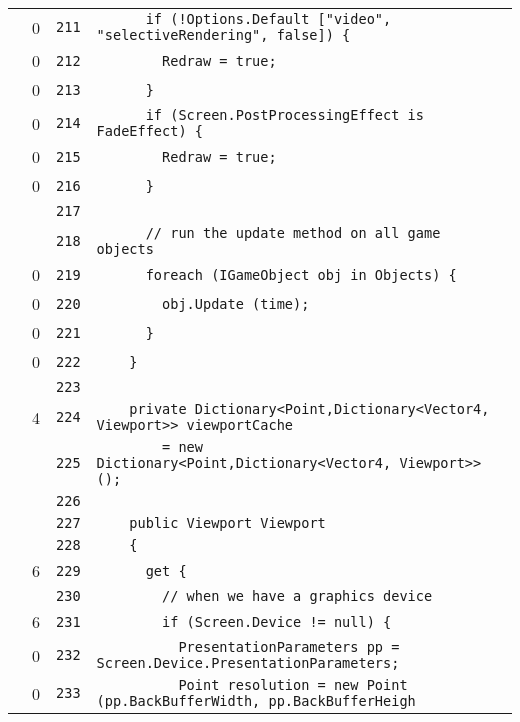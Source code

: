 \documentclass[a4paper,10pt]{article}
\begin{document}
\begin{longtable}[l]{lrrl}
\cellcolor{red} & 0 & \verb~211~ & \verb~      if (!Options.Default ["video", "selectiveRendering", false]) {~\\
\cellcolor{red} & 0 & \verb~212~ & \verb~        Redraw = true;~\\
\cellcolor{red} & 0 & \verb~213~ & \verb~      }~\\
\cellcolor{red} & 0 & \verb~214~ & \verb~      if (Screen.PostProcessingEffect is FadeEffect) {~\\
\cellcolor{red} & 0 & \verb~215~ & \verb~        Redraw = true;~\\
\cellcolor{red} & 0 & \verb~216~ & \verb~      }~\\
\cellcolor{gray} &  & \verb~217~ & \verb~~\\
\cellcolor{gray} &  & \verb~218~ & \verb~      // run the update method on all game objects~\\
\cellcolor{red} & 0 & \verb~219~ & \verb~      foreach (IGameObject obj in Objects) {~\\
\cellcolor{red} & 0 & \verb~220~ & \verb~        obj.Update (time);~\\
\cellcolor{red} & 0 & \verb~221~ & \verb~      }~\\
\cellcolor{red} & 0 & \verb~222~ & \verb~    }~\\
\cellcolor{gray} &  & \verb~223~ & \verb~~\\
\cellcolor{green} & 4 & \verb~224~ & \verb~    private Dictionary<Point,Dictionary<Vector4, Viewport>> viewportCache~\\
\cellcolor{gray} &  & \verb~225~ & \verb~        = new Dictionary<Point,Dictionary<Vector4, Viewport>> ();~\\
\cellcolor{gray} &  & \verb~226~ & \verb~~\\
\cellcolor{gray} &  & \verb~227~ & \verb~    public Viewport Viewport~\\
\cellcolor{gray} &  & \verb~228~ & \verb~    {~\\
\cellcolor{green} & 6 & \verb~229~ & \verb~      get {~\\
\cellcolor{gray} &  & \verb~230~ & \verb~        // when we have a graphics device~\\
\cellcolor{green} & 6 & \verb~231~ & \verb~        if (Screen.Device != null) {~\\
\cellcolor{red} & 0 & \verb~232~ & \verb~          PresentationParameters pp = Screen.Device.PresentationParameters;~\\
\cellcolor{red} & 0 & \verb~233~ & \verb~          Point resolution = new Point (pp.BackBufferWidth, pp.BackBufferHeigh~\\

\end{longtable}
\end{document}
